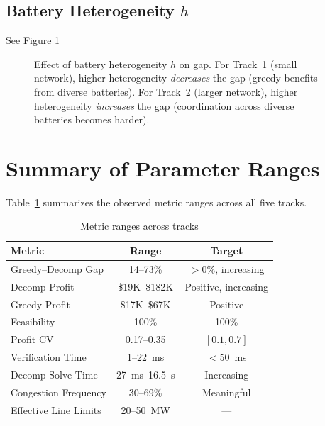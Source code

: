 \documentclass[11pt,a4paper]{article}
\begin{document}
\subsection{Battery Heterogeneity $h$}

See Figure \ref{fig:h-sweep}

\begin{figure}[H]
\centering
{}
\caption{Effect of battery heterogeneity $h$ on gap. For Track~1 (small network), higher heterogeneity \emph{decreases} the gap (greedy benefits from diverse batteries). For Track~2 (larger network), higher heterogeneity \emph{increases} the gap (coordination across diverse batteries becomes harder).}
\label{fig:h-sweep}
\end{figure}

\section{Summary of Parameter Ranges}

Table~\ref{tab:ranges} summarizes the observed metric ranges across all five tracks.

\begin{table}[h]
\centering
\caption{Metric ranges across tracks}
\label{tab:ranges}
\begin{tabular}{lcc}
\toprule
\textbf{Metric} & \textbf{Range} & \textbf{Target} \\
\midrule
Greedy--Decomp Gap & 14--73\% & $>0\%$, increasing \\
Decomp Profit & \$19K--\$182K & Positive, increasing \\
Greedy Profit & \$17K--\$67K & Positive \\
Feasibility & 100\% & 100\% \\
Profit CV & 0.17--0.35 & $[0.1, 0.7]$ \\
Verification Time & 1--22~ms & $<50$~ms \\
Decomp Solve Time & 27~ms--16.5~s & Increasing \\
Congestion Frequency & 30--69\% & Meaningful \\
Effective Line Limits & 20--50~MW & --- \\
\bottomrule
\end{tabular}
\end{table}
\end{document}
